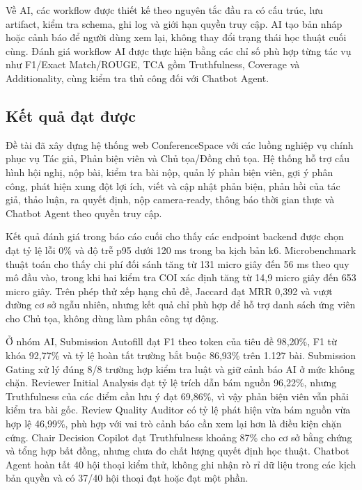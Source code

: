 \documentclass[12pt,a4paper]{article}
\begin{document}
Về AI, các workflow được thiết kế theo nguyên tắc đầu ra có cấu trúc, lưu artifact, kiểm tra schema, ghi log và giới hạn quyền truy cập. AI tạo bản nháp hoặc cảnh báo để người dùng xem lại, không thay đổi trạng thái học thuật cuối cùng. Đánh giá workflow AI được thực hiện bằng các chỉ số phù hợp từng tác vụ như F1/Exact Match/ROUGE, TCA gồm Truthfulness, Coverage và Additionality, cùng kiểm tra thủ công đối với Chatbot Agent.

\subsection{Kết quả đạt được}
\justifying

Đề tài đã xây dựng hệ thống web ConferenceSpace với các luồng nghiệp vụ chính phục vụ Tác giả, Phản biện viên và Chủ tọa/Đồng chủ tọa. Hệ thống hỗ trợ cấu hình hội nghị, nộp bài, kiểm tra bài nộp, quản lý phản biện viên, gợi ý phân công, phát hiện xung đột lợi ích, viết và cập nhật phản biện, phản hồi của tác giả, thảo luận, ra quyết định, nộp camera-ready, thông báo thời gian thực và Chatbot Agent theo quyền truy cập.

Kết quả đánh giá trong báo cáo cuối cho thấy các endpoint backend được chọn đạt tỷ lệ lỗi 0\% và độ trễ p95 dưới 120 ms trong ba kịch bản k6. Microbenchmark thuật toán cho thấy chi phí đối sánh tăng từ 131 micro giây đến 56 ms theo quy mô đầu vào, trong khi hai kiểm tra COI xác định tăng từ 14,9 micro giây đến 653 micro giây. Trên phép thử xếp hạng chủ đề, Jaccard đạt MRR 0,392 và vượt đường cơ sở ngẫu nhiên, nhưng kết quả chỉ phù hợp để hỗ trợ danh sách ứng viên cho Chủ tọa, không dùng làm phân công tự động.

Ở nhóm AI, Submission Autofill đạt F1 theo token của tiêu đề 98,20\%, F1 từ khóa 92,77\% và tỷ lệ hoàn tất trường bắt buộc 86,93\% trên 1.127 bài. Submission Gating xử lý đúng 8/8 trường hợp kiểm tra luật và giữ cảnh báo AI ở mức không chặn. Reviewer Initial Analysis đạt tỷ lệ trích dẫn bám nguồn 96,22\%, nhưng Truthfulness của các điểm cần lưu ý đạt 69,86\%, vì vậy phản biện viên vẫn phải kiểm tra bài gốc. Review Quality Auditor có tỷ lệ phát hiện vừa bám nguồn vừa hợp lệ 46,99\%, phù hợp với vai trò cảnh báo cần xem lại hơn là điều kiện chặn cứng. Chair Decision Copilot đạt Truthfulness khoảng 87\% cho cơ sở bằng chứng và tổng hợp bất đồng, nhưng chưa đo chất lượng quyết định học thuật. Chatbot Agent hoàn tất 40 hội thoại kiểm thử, không ghi nhận rò rỉ dữ liệu trong các kịch bản quyền và có 37/40 hội thoại đạt hoặc đạt một phần.
\end{document}
